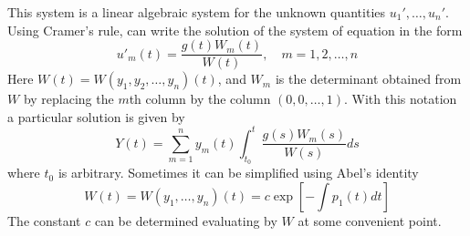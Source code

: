     This system is a linear algebraic system for the unknown quantities $u_1', \dots, u_n'$. Using Cramer's rule, can write the solution of the system of equation in the form
    $$u'_m(t) = \dfrac{g(t)W_m(t)}{W(t)}, \quad m = 1,2,\dots,n$$
    Here $W(t) = W(y_1, y_2, \dots, y_n)(t)$, and $W_m$ is the determinant obtained from $W$ by replacing the $m$th column by the column $(0,0,\dots,1)$. With this notation a particular solution is given by
    $$Y(t) = \sum_{m=1}^n y_m(t)\int_{t_0}^t \dfrac{g(s)W_m(s)}{W(s)}ds$$
    where $t_0$ is arbitrary. Sometimes it can be simplified using Abel's identity
    $$W(t) = W(y_1,\dots,y_n)(t) = c\exp[-\int p_1(t) dt]$$
    The constant $c$ can be determined evaluating by $W$ at some convenient point.
